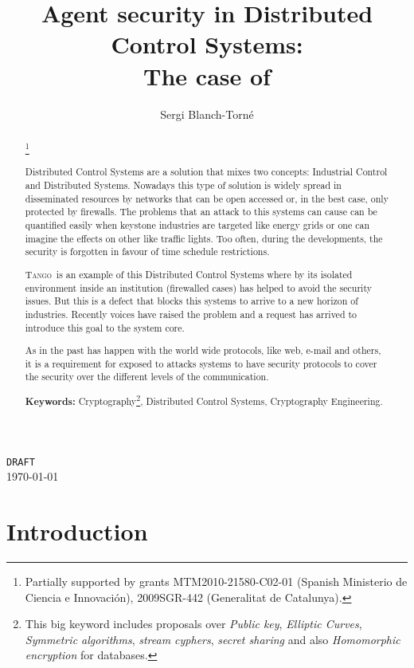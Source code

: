 \documentclass[10pt,a4paper,twoside]{llncs}
\title{Agent security in Distributed Control Systems: \\The case of \tango}
\author{Sergi Blanch-Torn\'e\inst{1}}%
\institute{
 Escola Polit\`ecnica Superior, Universitat de Lleida. Spain.\\
 \email{\tt sblanch@alumnes.udl.es}
 }
\newcommand{\tango}{\textsc{Tango}}
\begin{document}
\maketitle
\begin{center}
 {\tt DRAFT}\\
 \today\\
\end{center}

\begin{abstract}\footnote{Partially supported by grants MTM2010-21580-C02-01 (Spanish Ministerio de Ciencia e Innovaci\'on), 2009SGR-442 (Generalitat de Catalunya).}
 
    Distributed Control Systems are a solution that mixes two concepts: Industrial Control and Distributed Systems. Nowadays this type of solution is widely spread in disseminated resources by networks that can be open accessed or, in the best case, only protected by firewalls. The problems that an attack to this systems can cause can be quantified easily when keystone industries are targeted like energy grids or one can imagine the effects on other like traffic lights. Too often, during the developments, the security is forgotten in favour of time schedule restrictions.

    \tango\, is an example of this Distributed Control Systems where by its isolated environment inside an institution (firewalled cases) has helped to avoid the security issues. But this is a defect that blocks this systems to arrive to a new horizon of industries. Recently voices have raised the problem and a request has arrived to introduce this goal to the system core.

    As in the past has happen with the world wide protocols, like web, e-mail and others, it is a requirement for exposed to attacks systems to have security protocols to cover the security over the different levels of the communication.

{\bf Keywords:} Cryptography\footnote{This big keyword includes proposals over \emph{Public key}, \emph{Elliptic Curves}, \emph{Symmetric algorithms}, \emph{stream cyphers}, \emph{secret sharing} and also \emph{Homomorphic encryption} for databases.}, Distributed Control Systems, Cryptography Engineering.

\end{abstract}

\section{Introduction}\label{sec:introduction}
\end{document}
